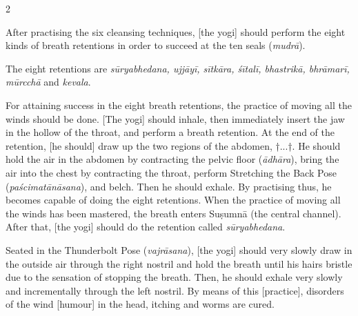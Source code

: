 \begin{nohyp}
\begin{multicols}{2}
\begin{eng}
After practising the six cleansing techniques, [the yogi] should perform the eight kinds of breath retentions in order to succeed at the ten seals (\textit{mudrā}). 
\vskip 7pt

{\leftskip=15pt
\rightskip=15pt
The eight retentions are \textit{sūryabhedana, ujjāyī, sītkāra, śītalī, bhastrikā, bhrāmarī, mūrcchā} and \textit{kevala}.
\par}
\vskip 7pt

For attaining success in the eight breath retentions, the practice of moving all the winds should be done. [The yogi] should inhale, then immediately insert the jaw in the hollow of the throat, and perform a breath retention. At the end of the retention, [he should] draw up the two regions of the abdomen, †...†. He should hold the air in the abdomen by contracting the pelvic floor (\textit{ādhāra}), bring the air into the chest by contracting the throat, perform Stretching the Back Pose (\textit{paścimatānāsana}), and belch. Then he should exhale. By practising thus, he becomes capable of doing the eight retentions. When the practice of moving all the winds has been mastered, the breath enters Suṣumnā (the central channel). After that, [the yogi] should do the retention called \textit{sūryabhedana}.
\vskip 7pt


Seated in the Thunderbolt Pose (\textit{vajrāsana}), [the yogi] should very slowly draw in the outside air through the right nostril and hold the breath until his hairs bristle due to the sensation of stopping the breath. Then, he should exhale very slowly and incrementally through the left nostril. By means of this [practice], disorders of the wind [humour] in the head, itching and worms are cured.
\columnbreak


\end{eng}
\end{multicols}
\end{nohyp}
